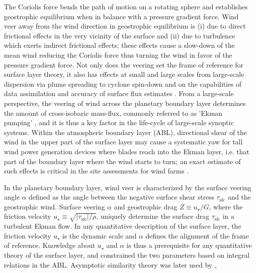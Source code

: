 \documentclass[smallcondensed,final]{svjour3}
\newcommand{\SFC}{\mathrm{sfc}}
\begin{document}
The Coriolis force bends the path of motion on a rotating sphere and establishes geostrophic equilibrium when in balance with a pressure gradient force. Wind veer away from the wind direction in geostrophic equilibrium is
(i) due to direct frictional effects in the very vicinity of the surface and
(ii) due to turbulence which exerts indirect frictional effects; these effects
cause a slow-down of the mean wind reducing the Coriolis force thus turning the wind
in favor of the pressure gradient force. 
Not only does the veering set the frame of reference for surface layer theory, it also has
effects at small and large scales from large-scale dispersion via plume spreading to
cyclone spin-down \citep{svensson:BM2009}
and on the capabilities of data assimilation and accuracy of surface flux estimates \citep{brown:QJR2005}. 
%
From a large-scale perspective, the veering of wind across the planetary boundary layer determines
the amount of cross-isobaric mass-flux, commonly referred to as 'Ekman pumping' \citep{ekman:AMA1905},
and it is thus a key factor in the life-cycle of large-scale synoptic systems.
%
% 
Within the atmospheric boundary layer (ABL), directional shear of the wind in
the upper part of the surface layer may cause a systematic yaw for tall wind power generation devices
where blades reach into the Ekman layer, i.e. that part of the boundary layer where the wind starts to turn;
an exact estimate of such effects is critical in the site assessments for wind farms
\citep{calaf:PF2010, mirocha:WES2018}. 
%
\par
%
In the planetary boundary layer, wind veer is characterized by the surface veering angle $\alpha$
defined as the angle between the negative surface shear stress $\tau_\SFC$ and the geostrophic wind.
%
Surface veering $\alpha$ and geostrophic drag $Z\equiv u_\star/G$, where the friction velocity $u_\star\equiv\sqrt{|\tau_\SFC|/\rho}$,
uniquely determine the surface drag $\tau_\SFC$ in a turbulent Ekman flow. 
%
In any quantitative description of the surface layer, the friction velocity $u_\star$ is the dynamic scale
and $\alpha$ defines the alignment of the frame of reference.
%
Knowledge about $u_\star$ and $\alpha$ is thus a prerequisite for any quantitative theory of the surface layer, 
and \citet{rossby:PIP1935} constrained the two parameters based on integral relations in the ABL.
%
Asymptotic similarity theory was later used by \cite{tennekes:JAS1973, blackadar:JAS1968},
\end{document}
